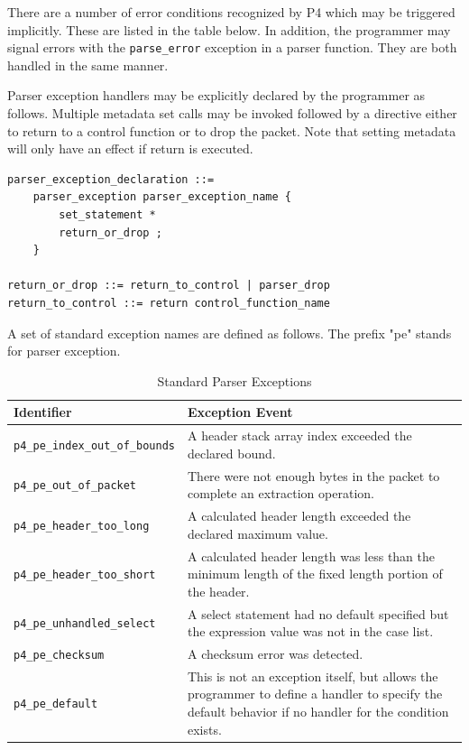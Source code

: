 \documentclass[12pt]{article}
\begin{document}
There are a number of error conditions recognized by P4 which may be triggered 
implicitly. These are listed in the table below. In addition, the programmer 
may signal errors with the \texttt{parse_error} exception in a parser function. They 
are both handled in the same manner.

Parser exception handlers may be explicitly declared by the programmer as 
follows. Multiple metadata set calls may be invoked followed by a directive 
either to return to a control function or to drop the packet. Note that setting 
metadata will only have an effect if return is executed.

\begin{lstlisting}[style=BNFstyle]
parser_exception_declaration ::=
    parser_exception parser_exception_name {
        set_statement *
        return_or_drop ;
    }

return_or_drop ::= return_to_control | parser_drop
return_to_control ::= return control_function_name
\end{lstlisting}



A set of standard exception names are defined as follows.  The prefix "pe" 
stands for parser exception.

\begin{table}[H]
\begin{center}
\begin{tabular}{| l | p{} |} \hline
\textbf{Identifier} &
\textbf{Exception Event} \\ \hline
\texttt{p4_pe_index_out_of_bounds} &
A header stack array index exceeded the declared bound. \\ \hline
\texttt{p4_pe_out_of_packet} &
There were not enough bytes in the packet to complete an extraction operation. \\ \hline
\texttt{p4_pe_header_too_long} &
A calculated header length exceeded the declared maximum value. \\ \hline
\texttt{p4_pe_header_too_short} &
A calculated header length was less than the minimum length of the fixed length 
portion of the header. \\ \hline
\texttt{p4_pe_unhandled_select} &
A select statement had no default specified but the expression value was not 
in the case list. \\ \hline
\texttt{p4_pe_checksum} &
A checksum error was detected. \\ \hline
\texttt{p4_pe_default} &
This is not an exception itself, but allows the programmer to define a handler 
to specify the default behavior if no handler for the condition exists. \\
\hline
\end{tabular}
\end{center}
\caption{Standard Parser Exceptions}
\label{tab:parserexceptions}
\end{table}
\end{document}

